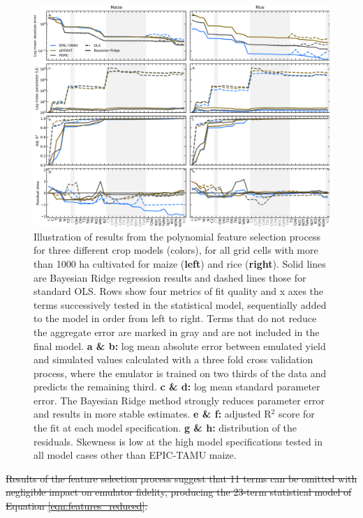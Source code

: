 \documentclass[gmdd]{copernicus} %
\providecommand{\DIFdel}[1]{{\protect\color{red}\sout{#1}}}                      %
\providecommand{\DIFdelbegin}{} %
\begin{document}
\begin{figure}[ht]
\centering
   \includegraphics[width=15cm]{figures/model_select_maize_rice.png}
    \caption{
    Illustration of results from the polynomial feature selection process for three different crop models (colors), for all grid cells with more than 1000 ha cultivated for maize (\textbf{left}) and rice (\textbf{right}). 
    Solid lines are Bayesian Ridge regression results and dashed lines those for standard OLS. Rows show four metrics of fit quality and x axes the terms successively tested in the statistical model, sequentially added to the model in order from left to right.
    Terms that do not reduce the aggregate error are marked in {\color{dark-gray} gray} and are not included in the final model. 
    \textbf{a \& b:} log mean absolute error between emulated yield and simulated values calculated with a three fold cross validation process, where the emulator is trained on two thirds of the data and predicts the remaining third.
    \textbf{c \& d:} log mean standard parameter error. The Bayesian Ridge method strongly reduces parameter error and results in more stable estimates. 
    \textbf{e \& f:} adjusted R$^2$ score for the fit at each model specification. 
    \textbf{g \& h:} distribution of the residuals. Skewness is low at the high model specifications tested in all model cases other than EPIC-TAMU maize.
    }
   \label{fig:features}
\end{figure}

\DIFdelbegin \DIFdel{Results of the feature selection process suggest that 11 terms can be omitted with negligible impact on emulator fidelity, producing the 23-term statistical model of Equation \ref{eqn:features_reduced}.
}%
\end{document}
